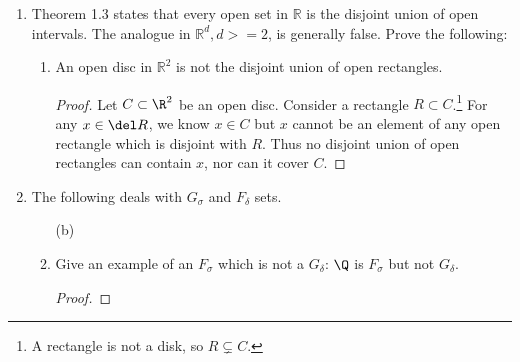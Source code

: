 \documentclass[letterpaper]{article}
\renewcommand{\mathcal}[1]{\pazocal{#1}}
\begin{document}
\begin{enumerate}
\begin{enumerate}[label=(\alph*)]
\begin{proof}
		\end{proof}
		\item Show also that $\hat{\mathcal{C}}$ is uncountable.
		\begin{proof}
		In each step $\hat{\mathcal{C}}_k$ of the construction of $\hat{\mathcal{C}}$, the set is composed of $2^{k-1}$ closed intervals. This is also true of the usual Cantor set, $\mathcal{C}$. Since any two closed intervals are isomorphic\footnote{If this is not obvious, consider $[\alpha, \beta]$ and $[a,b]$. Map $\alpha\mapsto a$ and $\beta\mapsto b$, and extend linearly.}, then each $\hat{\mathcal{C}}_k$ is isomorphic to $\mathcal{C}_k$, and so are the limiting sets $\hat{\mathcal{C}}\cong\mathcal{C}$. We know that $\mathcal{C}$ is uncountable, so we are done.
		\end{proof}
	\end{enumerate}

	\setcounter{enumi}{11}
	\item Theorem 1.3 states that every open set in $\mathbb{R}$ is the disjoint union of open intervals. The analogue in $\mathbb{R}^d, d >= 2$, is generally false. Prove the following:
		\begin{enumerate}
		\item An open disc in $\mathbb{R}^2$ is not the disjoint union of open rectangles.
		\begin{proof}
		Let $C\subset\R^2$ be an open disc.
		Consider a rectangle $R\subset C$.\footnote{A rectangle is not a disk, so $R\subsetneq C$.} For any $x\in\del R$, we know $x\in C$ but $x$ cannot be an element of any open rectangle which is disjoint with $R$. Thus no disjoint union of open rectangles can contain $x$, nor can it cover $C$.
		\end{proof}
		\end{enumerate}

  \item The following deals with $G_{\sigma}$ and $F_{\delta}$ sets.
  \begin{enumerate}
    \item[(b)] \item Give an example of an $F_{\sigma}$ which is not a $G_{\delta}$:
    \answer $\Q$ is $F_{\sigma}$ but not $G_{\delta}$.
    \begin{proof}
    \end{proof}
  \end{enumerate}


\end{enumerate}
\end{document}
